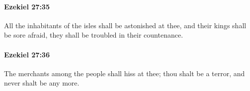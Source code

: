 		\paragraph{Ezekiel 27:35} %
			\label{EZEKIEL-27-35}

			All the inhabitants of the isles shall be astonished at thee, and their kings shall be sore afraid, they shall be troubled in their countenance.


		\paragraph{Ezekiel 27:36} %
			\label{EZEKIEL-27-36}

			The merchants among the people shall hiss at thee; thou shalt be a terror, and never shalt be any more.

